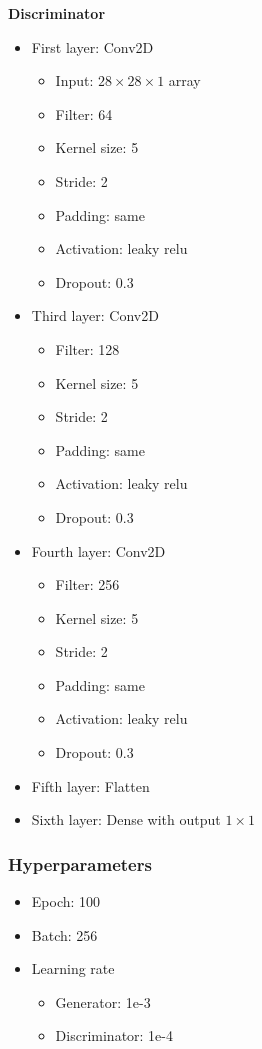 \documentclass{article}
\begin{document}
\begin{multicols*}{2}
\vfill\null
\columnbreak

\textbf{Discriminator}
\begin{itemize}
  \item First layer: Conv2D
    \begin{itemize}
      \item Input: $28 \times 28\times 1$ array
      \item Filter: 64
      \item Kernel size: 5
      \item Stride: 2
      \item Padding: same
      \item Activation: leaky relu
      \item Dropout: 0.3
  \end{itemize} 
  \item Third layer: Conv2D
    \begin{itemize}
      \item Filter: 128
      \item Kernel size: 5
      \item Stride: 2
      \item Padding: same
      \item Activation: leaky relu
      \item Dropout: 0.3
    \end{itemize}   
  \item Fourth layer: Conv2D
    \begin{itemize}
      \item Filter: 256
      \item Kernel size: 5
      \item Stride: 2
      \item Padding: same
      \item Activation: leaky relu
      \item Dropout: 0.3
    \end{itemize} 
  \item Fifth layer: Flatten
  \item Sixth layer: Dense with output $1\times 1$
\end{itemize}
\end{multicols*}

\subsubsection{Hyperparameters}

\begin{itemize}
  \item Epoch: 100
  \item Batch: 256
  \item Learning rate
    \begin{itemize}
      \item Generator: 1e-3
      \item Discriminator: 1e-4
    \end{itemize}
\end{itemize}
\end{document}
